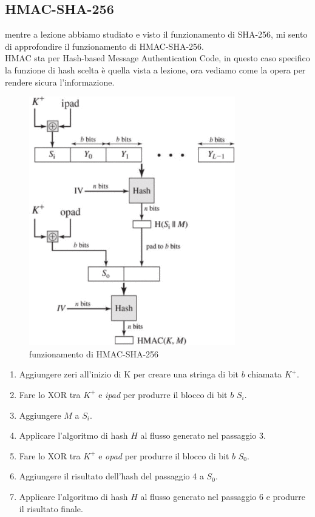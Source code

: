\documentclass[a4paper,12pt]{report}
\begin{document}
		\subsection{HMAC-SHA-256}
			mentre a lezione abbiamo studiato e visto il funzionamento di SHA-256, mi sento 
			di approfondire il funzionamento di HMAC-SHA-256.\\
			HMAC sta per Hash-based Message Authentication Code, in questo caso specifico
			la funzione di hash scelta è quella vista a lezione, ora vediamo come la opera 
			per rendere sicura l'informazione.\cite{HMAC}
			\begin{figure}[H]
				\centering
				\includegraphics[width=0.8\textwidth]{HMAC-structure.png}
				\caption{funzionamento di HMAC-SHA-256}
				\label{fig:hmac-sha256}
			\end{figure}
			\begin{enumerate}
				\item Aggiungere zeri all'inizio di K per creare una stringa di bit $b$
				chiamata $K^+$.
				\item Fare lo XOR tra $K^+$ e \textit{ipad} per produrre il blocco di bit
				$b$ $S_i$.
				\item Aggiungere $M$ a $S_i$.
				\item Applicare l'algoritmo di hash $H$ al flusso generato nel passaggio 3.
				\item Fare lo XOR tra $K^+$ e \textit{opad} per produrre il blocco di bit
				$b$ $S_0$.
				\item Aggiungere il risultato dell'hash del passaggio 4 a $S_0$.
				\item Applicare l'algoritmo di hash $H$ al flusso generato nel passaggio 6 e
				produrre il risultato finale.
			\end{enumerate}
\end{document}
